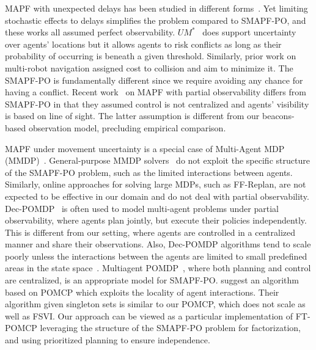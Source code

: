\documentclass[letterpaper]{article} %
\begin{document}
MAPF with unexpected delays has been studied in different forms~\cite{atzmon2020probabilistic,shahar2021safe,atzmon2020robust,ma2017multiAgent}. Yet limiting stochastic effects to delays simplifies the problem compared to SMAPF-PO, and these works all assumed perfect observability. 
$UM^*$~\cite{wagner2017path} does support uncertainty over agents' locations but it allows agents to risk conflicts as long as their probability of occurring is beneath a given threshold. Similarly, prior work on multi-robot navigation assigned cost to collision and aim to minimize it. 
The SMAPF-PO is fundamentally different since we require avoiding any chance for having a conflict. %
Recent work~\cite{davydov2021q} on MAPF with partial observability differs from SMAPF-PO in that they assumed control is not centralized and agents' visibility is based on line of sight. The latter assumption is different from our beacons-based observation model, precluding empirical comparison.


MAPF under movement uncertainty is a special case of Multi-Agent MDP (MMDP)~\cite{boutilier1996planning}. 
General-purpose MMDP solvers~\cite{de2021constrained} do not exploit the specific structure of the SMAPF-PO problem, such as the limited interactions between agents. Similarly, online approaches for solving large MDPs, such as FF-Replan\cite{yoon2007ff}, are not expected to be effective in our domain and do not deal with partial observability. 
Dec-POMDP~\cite{oliehoek2012decentralized} is often used to model multi-agent problems under partial observability, where agents plan jointly, but execute their policies independently.
This is different from our setting, where agents are controlled in a centralized manner and share their observations. 
Also, Dec-POMDP algorithms tend to scale poorly unless the interactions between the agents are limited to small predefined areas in the state space~\cite{melo2009learning}. 
Multiagent POMDP~\cite{oliehoek2017madp}, where both planning and control are centralized, is an appropriate model for SMAPF-PO.  \citet{amato2015scalable} suggest an algorithm based on POMCP which exploits the locality of agent interactions. 
Their algorithm given singleton sets is similar to our POMCP, which does not scale as well as FSVI. 
Our approach can be viewed as a particular implementation of FT-POMCP leveraging the structure of the SMAPF-PO problem for factorization, and using prioritized planning to ensure independence.
\end{document}
